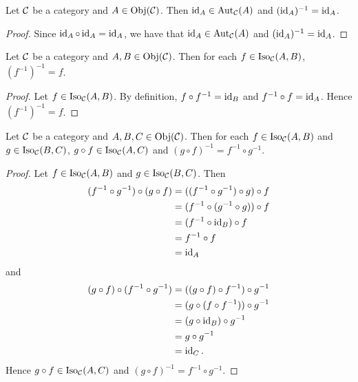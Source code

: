 \documentclass{book}
\begin{document}
	\begin{ex} 
		Let $\mathcal{C}$ be a category and $A \in \operatorname{Obj}(\mathcal{C})$. Then $\operatorname{id}_A \in \operatorname{Aut}_{\mathcal{C}}(A)$ and $(\operatorname{id}_A)^{-1} = \operatorname{id}_A$. 
	\end{ex}
	
	\begin{proof}
		Since $\operatorname{id}_A \circ \operatorname{id}_A = \operatorname{id}_A$, we have that $\operatorname{id}_A \in \operatorname{Aut}_{\mathcal{C}}(A)$ and $(\operatorname{id}_A)^{-1} = \operatorname{id}_A$. 
	\end{proof}
	
	\begin{ex} 
		Let $\mathcal{C}$ be a category and $A, B \in \operatorname{Obj}(\mathcal{C})$. Then for each $f \in \operatorname{Iso}_{\mathcal{C}}(A, B)$, $(f^{-1})^{-1} = f$.
	\end{ex}
	
	\begin{proof}
		Let $f \in \operatorname{Iso}_{\mathcal{C}}(A, B)$. By definition, $f \circ f^{-1} = \operatorname{id}_{B}$ and $f^{-1} \circ f = \operatorname{id}_A$. Hence $(f^{-1})^{-1} = f$.
	\end{proof}
	
	\begin{ex} 
		Let $\mathcal{C}$ be a category and $A,B,C \in \operatorname{Obj}(\mathcal{C})$. Then for each $f \in \operatorname{Iso}_{\mathcal{C}}(A, B)$ and $g \in \operatorname{Iso}_{\mathcal{C}}(B, C)$, $g \circ f \in \operatorname{Iso}_{\mathcal{C}}(A, C)$ and $(g \circ f)^{-1} = f^{-1} \circ g^{-1}$. 
	\end{ex}
	
	\begin{proof}
		Let $f \in \operatorname{Iso}_{\mathcal{C}}(A, B)$ and $g \in \operatorname{Iso}_{\mathcal{C}}(B, C)$. Then 
		\begin{align*}
			(f^{-1} \circ g^{-1}) \circ (g \circ f) 
			& = ((f^{-1} \circ g^{-1}) \circ g) \circ f \\
			& = (f^{-1} \circ (g^{-1} \circ g)) \circ f \\
			& = (f^{-1} \circ \operatorname{id}_B) \circ f \\
			& = f^{-1} \circ f \\
			& = \operatorname{id}_{A}
		\end{align*}
		and 
		\begin{align*}
			(g \circ f) \circ (f^{-1} \circ g^{-1}) 
			& = ((g \circ f) \circ f^{-1}) \circ g^{-1} \\
			& = (g \circ (f \circ f^{-1})) \circ g^{-1} \\
			& = (g \circ \operatorname{id}_{B}) \circ g^{-1} \\
			& = g \circ  g^{-1} \\
			& = \operatorname{id}_{C}.
		\end{align*}
		Hence $g \circ f \in  \operatorname{Iso}_{\mathcal{C}}(A, C)$ and $(g \circ f)^{-1} = f^{-1} \circ g^{-1}$.
	\end{proof}
	
\end{document}
